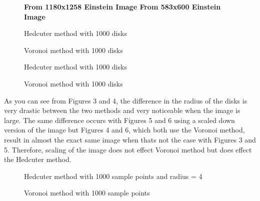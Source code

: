 \documentclass[11pt]{article}
\begin{document}
\begin{enumerate}
\begin{figure}[!htb]
    \centering
   \textbf{From 1180x1258 Einstein Image \hspace{55pt} From 583x600 Einstein Image}\par\medskip
    \begin{minipage}{0.23\textwidth}
        \centering
        \caption{\newline Hedcuter method with 1000 disks}
    \end{minipage}\hfill
    \begin{minipage}{0.23\textwidth}
        \centering
        \caption{\newline Voronoi method with 1000 disks}
    \end{minipage}\hfill
    \begin{minipage}{0.23\textwidth}
        \centering
        \caption{\newline Hedcuter method with 1000 disks}
    \end{minipage}\hfill
    \begin{minipage}{0.23\textwidth}
        \centering
        \caption{\newline Voronoi method with 1000 disks}
    \end{minipage}
\end{figure}

\hfill

\begin{adjustwidth}{24pt}{}
As you can see from Figures 3 and 4, the difference in the radius of the disks is very drastic between the two methods and very noticeable when the image is large. The same difference occurs with Figures 5 and 6 using a scaled down version of the image but Figures 4 and 6, which both use the Voronoi method, result in almost the exact same image when thats not the case with Figures 3 and 5. Therefore, scaling of the image does not effect Voronoi method but does effect the Hedcuter method.
\end{adjustwidth}

\hfill

\begin{figure}[!htb]
    \centering 
    \begin{minipage}{0.48\textwidth}
        \centering
        \caption{Hedcuter method with 1000 sample points and radius = 4}
    \end{minipage}\hfill
    \begin{minipage}{0.48\textwidth}
        \centering
        \caption{Voronoi method with 1000 sample points}
    \end{minipage}
\end{figure}



\end{enumerate}
\end{document}
